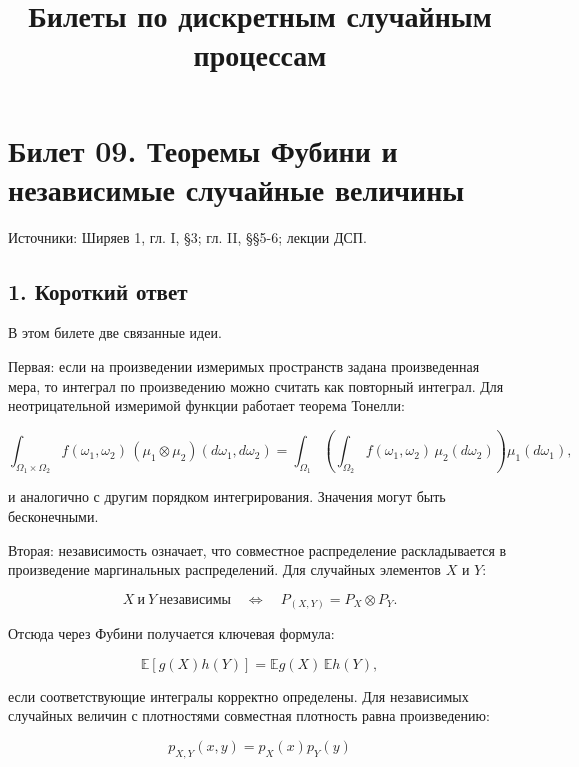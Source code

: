 \documentclass[
  11pt,
  a4paper,
]{article}
\title{Билеты по дискретным случайным процессам}
\author{}
\date{}
\begin{document}
\maketitle

\section{Билет 09. Теоремы Фубини и независимые случайные
величины}\label{ux431ux438ux43bux435ux442-09.-ux442ux435ux43eux440ux435ux43cux44b-ux444ux443ux431ux438ux43dux438-ux438-ux43dux435ux437ux430ux432ux438ux441ux438ux43cux44bux435-ux441ux43bux443ux447ux430ux439ux43dux44bux435-ux432ux435ux43bux438ux447ux438ux43dux44b}

Источники: Ширяев 1, гл. I, §3; гл. II, §§5-6; лекции ДСП.

\subsection{1. Короткий
ответ}\label{ux43aux43eux440ux43eux442ux43aux438ux439-ux43eux442ux432ux435ux442}

В этом билете две связанные идеи.

Первая: если на произведении измеримых пространств задана произведенная
мера, то интеграл по произведению можно считать как повторный интеграл.
Для неотрицательной измеримой функции работает теорема Тонелли:

\[
\int_{\Omega_1\times\Omega_2} f(\omega_1,\omega_2)\,(\mu_1\otimes\mu_2)(d\omega_1,d\omega_2)
=
\int_{\Omega_1}
\left(
\int_{\Omega_2} f(\omega_1,\omega_2)\,\mu_2(d\omega_2)
\right)
\mu_1(d\omega_1),
\]

и аналогично с другим порядком интегрирования. Значения могут быть
бесконечными.

Вторая: независимость означает, что совместное распределение
раскладывается в произведение маргинальных распределений. Для случайных
элементов \(X\) и \(Y\):

\[
X\ \text{и}\ Y\ \text{независимы}
\quad\Longleftrightarrow\quad
P_{(X,Y)}=P_X\otimes P_Y.
\]

Отсюда через Фубини получается ключевая формула:

\[
\mathbb E[g(X)h(Y)]
=
\mathbb E g(X)\,\mathbb E h(Y),
\]

если соответствующие интегралы корректно определены. Для независимых
случайных величин с плотностями совместная плотность равна произведению:

\[
p_{X,Y}(x,y)=p_X(x)p_Y(y)
\]
\end{document}
